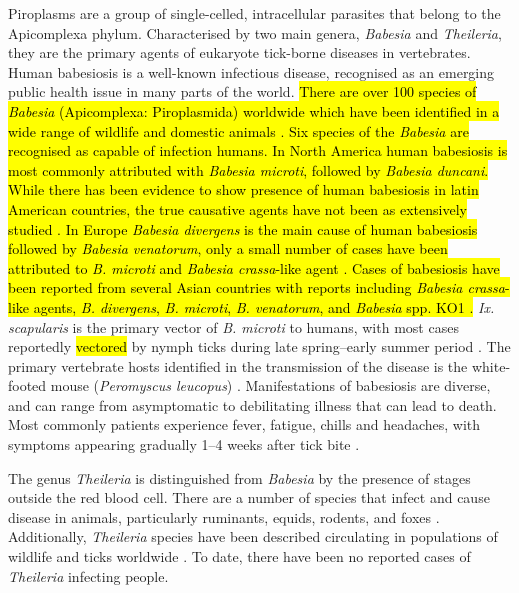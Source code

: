 \documentclass[a4paper, nobind]{templates/ociamthesis}
\begin{document}
Piroplasms are a group of single-celled, intracellular parasites that belong to the Apicomplexa phylum.
Characterised by two main genera, \emph{Babesia} and \emph{Theileria}, they are the primary agents of eukaryote tick-borne diseases in vertebrates.
Human babesiosis is a well-known infectious disease, recognised as an emerging public health issue in many parts of the world.
\hl{There are over 100 species of \emph{Babesia} (Apicomplexa: Piroplasmida) worldwide which have been identified in a wide range of wildlife and domestic animals \autocite{kumarGlobalEmergenceHuman2021}. Six species of the \emph{Babesia} are recognised as capable of infection humans. In North America human babesiosis is most commonly attributed with \emph{Babesia microti}, followed by \emph{Babesia duncani}. While there has been evidence to show presence of human babesiosis in latin American countries, the true causative agents have not been as extensively studied \autocite{kumarGlobalEmergenceHuman2021}. In Europe \emph{Babesia divergens} is the main cause of human babesiosis followed by \emph{Babesia venatorum}, only a small number of cases have been attributed to \emph{B. microti} and \emph{Babesia crassa}-like agent \autocite{hildebrandtHumanBabesiosisEurope2021,vannierHumanBabesiosis2012}. Cases of babesiosis have been reported from several Asian countries with reports including \emph{Babesia crassa}-like agents, \emph{B. divergens}, \emph{B. microti}, \emph{B. venatorum}, and \emph{Babesia} spp. KO1 \autocite{kumarGlobalEmergenceHuman2021}.}
\emph{Ix. scapularis} is the primary vector of \emph{B. microti} to humans, with most cases reportedly \hl{vectored} by nymph ticks during late spring--early summer period \autocite{spielmanEcologyIxodesDamminiborne1985,swansonCoinfectionsAcquiredIxodes2006}.
The primary vertebrate hosts identified in the transmission of the disease is the white-footed mouse (\emph{Peromyscus leucopus}) \autocite{spielmanEcologyIxodesDamminiborne1985}.
Manifestations of babesiosis are diverse, and can range from asymptomatic to debilitating illness that can lead to death.
Most commonly patients experience fever, fatigue, chills and headaches, with symptoms appearing gradually 1--4 weeks after tick bite \autocite{vannierHumanBabesiosis2008}.

The genus \emph{Theileria} is distinguished from \emph{Babesia} by the presence of stages outside the red blood cell.
There are a number of species that infect and cause disease in animals, particularly ruminants, equids, rodents, and foxes \autocite{almazanBabesiosisTheileriosisNorth2022}.
Additionally, \emph{Theileria} species have been described circulating in populations of wildlife and ticks worldwide \autocite{mansReviewTheileriaDiagnostics2015,wattsTheileriaOrientalisReview2016}.
To date, there have been no reported cases of \emph{Theileria} infecting people.
\end{document}
